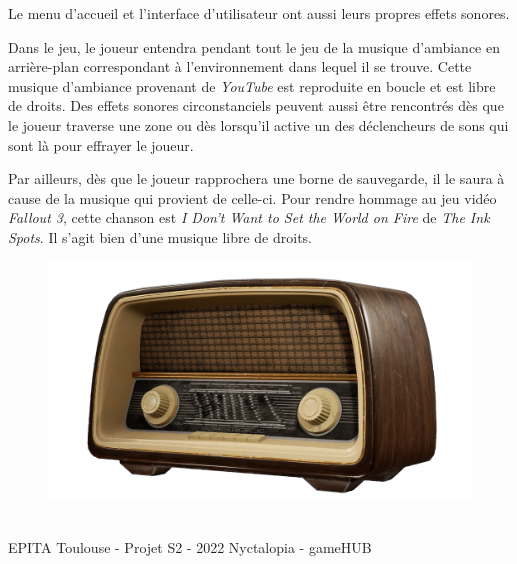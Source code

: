 Le menu d'accueil et l'interface d'utilisateur ont aussi leurs propres effets sonores.

Dans le jeu, le joueur entendra pendant tout le jeu de la musique d'ambiance en arrière-plan correspondant à l'environnement dans lequel il se trouve. Cette musique d'ambiance provenant de \emph{YouTube} est reproduite en boucle et est libre de droits. Des effets sonores circonstanciels peuvent aussi être rencontrés dès que le joueur traverse une zone ou dès lorsqu'il active un des déclencheurs de sons qui sont là pour effrayer le joueur.

Par ailleurs, dès que le joueur rapprochera une borne de sauvegarde, il le saura à cause de la musique qui provient de celle-ci. Pour rendre hommage au jeu vidéo \emph{Fallout 3}, cette chanson est \emph{I Don't Want to Set the World on Fire} de \emph{The Ink Spots}. Il s'agit bien d'une musique libre de droits.

\begin{figure}[H]
\centering
\begin{minipage}{.5\textwidth}
  \centering
  \centerline{\includegraphics[width=1\linewidth]{img/assets/save.png}}
  \label{fig:save}
\end{minipage}%
\end{figure}


\vfill
\noindent\makebox[\linewidth]{\rule{.8\paperwidth}{.6pt}}\\[0.2cm]
EPITA Toulouse - Projet S2 - 2022 \hfill Nyctalopia - gameHUB
\noindent\makebox[\linewidth]{\rule{.8\paperwidth}{.6pt}}

